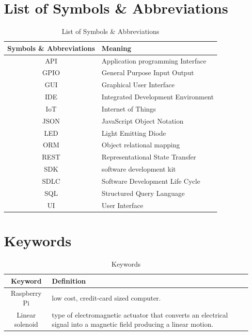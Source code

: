 \documentclass[12pt, oneside, a4paper]{book}
\newcommand\boldcolor[1]{\textcolor{bold}{\textbf{#1}}}
\begin{document}
	\listoffigures
	\newpage
	
	\chapter*{List of Symbols \& Abbreviations}
	\label{sec:sym}
	\def\arraystretch{1.5}
	\begin{table}[H]
		\begin{center}
			\begin{tabularx}{\linewidth}{|c|X|}\hline
				
				\boldcolor{Symbols \& Abbreviations} & \boldcolor{Meaning} \\\hline
				API & Application programming Interface\\\hline
				GPIO & General Purpose Input Output\\\hline
				GUI & Graphical User Interface\\\hline
				IDE & Integrated Development Environment \\\hline
				IoT & Internet of Things \\\hline
				JSON & JavaScript Object Notation\\\hline
				LED & Light Emitting Diode\\\hline
				ORM & Object relational mapping\\\hline
				REST & Representational State Transfer\\\hline
				SDK & software development kit \\\hline
				SDLC & Software Development Life Cycle\\\hline
				SQL & Structured Query Language\\\hline
				UI & User Interface\\\hline
			\end{tabularx}
		\end{center}
		\caption{List of Symbols \& Abbreviations}
	\end{table}
	\newpage
	\chapter*{Keywords}
	\label{sec:kw}
	\def\arraystretch{1.5}
	\begin{table}[H]
		\begin{center}
			\begin{tabularx}{\linewidth}{|c|X|}\hline		
				\boldcolor{Keyword} & \boldcolor{Definition} \\\hline
				Raspberry Pi & low cost, credit-card sized computer\cite{raspberry}. \\\hline
				Linear solenoid &  type of electromagnetic actuator that converts an electrical signal into a magnetic field producing a linear motion\cite{linear}.\\\hline				
			\end{tabularx}
		\end{center}
		\caption{Keywords}
	\end{table}
	\newpage
\end{document}
